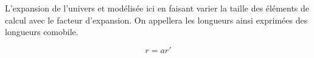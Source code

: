 

%
%
%
%

L'expansion de l'univers et modélisée ici en faisant varier la taille des éléments de calcul avec le facteur d'expansion.
On appellera les longueurs ainsi exprimées des longueurs comobile.

\begin{equation}
r=a r'
\end{equation}

